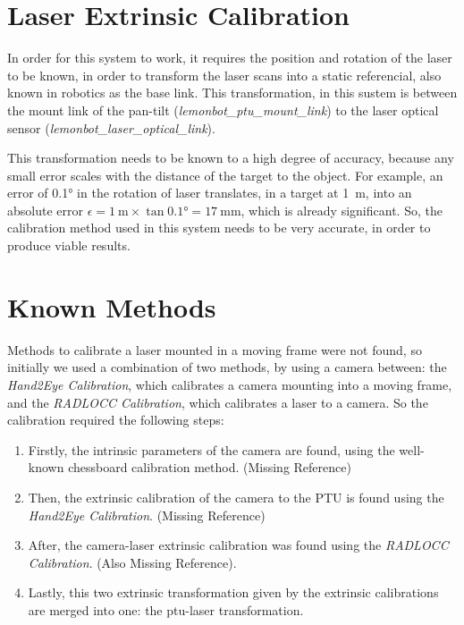 \section{Laser Extrinsic Calibration}

In order for this system to work, it requires the position and rotation of the laser to be known, in order to transform the laser scans into a static referencial, also known in robotics as the base link. This transformation, in this sustem is between the mount link of the pan-tilt (\textit{lemonbot\_ptu\_mount\_link}) to the laser optical sensor (\textit{lemonbot\_laser\_optical\_link}).

This transformation needs to be known to a high degree of accuracy, because any small error scales with the distance of the target to the object. For example, an error of \ang{0.1} in the rotation of laser translates, in a target at \SI{1}{\meter}, into an absolute error $\epsilon = \SI{1}{\meter} \times \tan{\ang{0.1}} = \SI{17}{\milli\meter}$, which is already significant. So, the calibration method used in this system needs to be very accurate, in order to produce viable results.

\section{Known Methods}

Methods to calibrate a laser mounted in a moving frame were not found, so initially we used a combination of two methods, by using a camera between: the \textit{Hand2Eye Calibration}, which calibrates a camera mounting into a moving frame, and the \textit{RADLOCC Calibration}, which calibrates a laser to a camera. So the calibration required the following steps:

\begin{enumerate}
    \item Firstly, the intrinsic parameters of the camera are found, using the well-known chessboard calibration method. (Missing Reference)
    \item Then, the extrinsic calibration of the camera to the PTU is found using the \textit{Hand2Eye Calibration}. (Missing Reference)
    \item After, the camera-laser extrinsic calibration was found using the \textit{RADLOCC Calibration}. (Also Missing Reference).
    \item Lastly, this two extrinsic transformation given by the extrinsic calibrations are merged into one: the ptu-laser transformation.
\end{enumerate}

